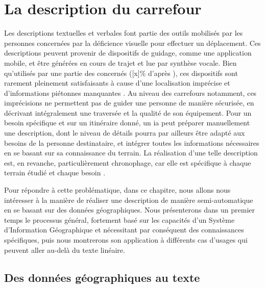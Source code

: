 \chapter{La description du carrefour}



Les descriptions textuelles et verbales font partie des outils mobilisés par les personnes concernées par la déficience visuelle pour effectuer un déplacement. Ces descriptions peuvent provenir de dispositifs de guidage, comme une application mobile, et être générées en cours de trajet et lue par synthèse vocale. Bien qu’utilisés par une partie des concernés ([x]\% d’après \cite{homere_2023}), ces dispositifs sont rarement pleinement satisfaisants à cause d’une localisation imprécise et d’informations piétonnes manquantes \missref{}. Au niveau des carrefours notamment, ces imprécisions ne permettent pas de guider une personne de manière sécurisée, en décrivant intégralement une traversée et la qualité de son équipement. Pour un besoin spécifique et sur un itinéraire donné, un \gls{ia} peut préparer manuellement une description, dont le niveau de détails pourra par ailleurs être adapté aux besoins de la personne destinataire, et intégrer toutes les informations nécessaires en se basant sur sa connaissance du terrain. La réalisation d’une telle description est, en revanche, particulièrement chronophage, car elle est spécifique à chaque terrain étudié et chaque besoin \missref{}.

\newpar{}

Pour répondre à cette problématique, dans ce chapitre, nous allons nous intéresser à la manière de réaliser une description de manière semi-automatique en se basant sur des données géographiques. Nous présenterons dans un premier temps le processus général, fortement basé sur les capacités d’un Système d’Information Géographique et nécessitant par conséquent des connaissances spécifiques, puis nous montrerons son application à différents cas d’usages qui peuvent aller au-delà du texte linéaire.


\section{Des données géographiques au texte}

\label{sec:description_geodata_to_text}

